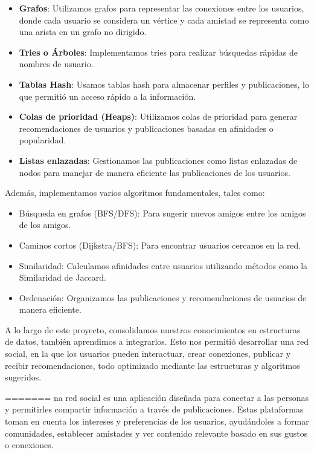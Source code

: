 \documentclass[9pt,letterpaper,onecolumn]{rho-class/rho}
\begin{document}
\begin{itemize}
    \item \textbf{Grafos}: Utilizamos grafos para representar las conexiones entre los usuarios, donde cada usuario se considera un vértice y cada amistad se representa como una arista en un grafo no dirigido.
    \item \textbf{Tries o Árboles}: Implementamos tries para realizar búsquedas rápidas de nombres de usuario.
    \item \textbf{Tablas Hash}: Usamos tablas hash para almacenar perfiles y publicaciones, lo que permitió un acceso rápido a la información.
    \item \textbf{Colas de prioridad (Heaps)}: Utilizamos colas de prioridad para generar recomendaciones de usuarios y publicaciones basadas en afinidades o popularidad.
    \item \textbf{Listas enlazadas}: Gestionamos las publicaciones como listas enlazadas de nodos para manejar de manera eficiente las publicaciones de los usuarios.
\end{itemize}

Además, implementamos varios algoritmos fundamentales, tales como:

\begin{itemize}
    \item Búsqueda en grafos (BFS/DFS): Para sugerir nuevos amigos entre los amigos de los amigos.
    \item Caminos cortos (Dijkstra/BFS): Para encontrar usuarios cercanos en la red.
    \item Similaridad: Calculamos afinidades entre usuarios utilizando métodos como la Similaridad de Jaccard.
    \item Ordenación: Organizamos las publicaciones y recomendaciones de usuarios de manera eficiente.
\end{itemize}

A lo largo de este proyecto, consolidamos nuestros conocimientos en estructuras de datos, también aprendimos a integrarlos. Esto nos permitió desarrollar una red social, en la que los usuarios pueden interactuar, crear conexiones, publicar y recibir recomendaciones, todo optimizado mediante las estructuras y algoritmos sugeridos.

=======
na red social es una aplicación diseñada para conectar a las personas y permitirles compartir información a través de publicaciones. Estas plataformas toman en cuenta los intereses y preferencias de los usuarios, ayudándoles a formar comunidades, establecer amistades y ver contenido relevante basado en sus gustos o conexiones.
\end{document}
